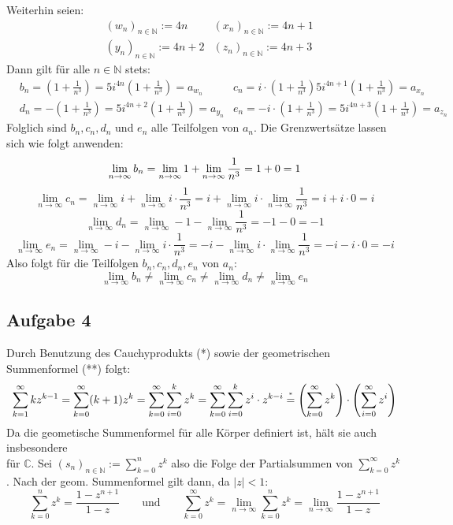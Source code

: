 \documentclass[a4paper,graphics,11pt]{article}
\newcommand{\aufgabe}[1]{\subsection*{Aufgabe #1}}
\newcommand{\up}[2]{\mathrel{\overset{\makebox[0pt]{\mbox{\normalfont\tiny #2}}}{#1}}}
\begin{document}
Weiterhin seien:
\begin{align*}
    &(w_n)_{n\in \mathbb{N}} := 4n&
    (x_n)_{n\in \mathbb{N}} := 4n+1\\
    &(y_n)_{n\in \mathbb{N}} := 4n+2&
    (z_n)_{n\in \mathbb{N}} := 4n+3
\end{align*}
Dann gilt für alle $n\in \mathbb{N}$ stets:
\begin{align*}
    &b_n = \left(1+\frac{1}{n^3}\right)=  5i^{4n}\left(1+\frac{1}{n^3}\right) = a_{w_n}&
    c_n = i\cdot\left(1+\frac{1}{n^3}\right)5i^{4n+1}\left(1+\frac{1}{n^3}\right) = a_{x_n}\\
    &d_n = -\left(1+\frac{1}{n^3}\right) = 5i^{4n+2}\left(1+\frac{1}{n^3}\right) = a_{y_n}&
    e_n = -i\cdot\left(1+\frac{1}{n^3}\right)=5i^{4n+3}\left(1+\frac{1}{n^3}\right) = a_{z_n}
\end{align*}
Folglich sind $b_n,c_n,d_n$ und $e_n$ alle Teilfolgen von $a_n$.
Die Grenzwertsätze lassen sich wie folgt anwenden:
$$
    \lim_{n \to \infty} b_n
    = \lim_{n \to \infty} 1+ \lim_{n \to \infty} \frac{1}{n^3}
    = 1+0 =1\\
$$$$
    \lim_{n \to \infty} c_n
    = \lim_{n \to \infty} i+ \lim_{n \to \infty} i\cdot \frac{1}{n^3}
    = i+\lim_{n \to \infty} i\cdot \lim_{n \to \infty} \frac{1}{n^3}
    = i+i\cdot 0 = i
$$$$
    \lim_{n \to \infty} d_n
    = \lim_{n \to \infty} -1 - \lim_{n \to \infty} \frac{1}{n^3}
    = -1 - 0 = -1
$$$$
   \lim_{n \to \infty} e_n
    = \lim_{n \to \infty} -i- \lim_{n \to \infty} i\cdot \frac{1}{n^3}
    = -i-\lim_{n \to \infty} i\cdot \lim_{n \to \infty} \frac{1}{n^3}
    = -i-i\cdot 0 = -i
$$
Also folgt für die Teilfolgen $b_n,c_n,d_n,e_n$ von $a_n\colon$
$$
    \lim_{n \to \infty} b_n \neq
    \lim_{n \to \infty} c_n \neq
    \lim_{n \to \infty} d_n \neq
    \lim_{n \to \infty} e_n
$$
\newpage
\aufgabe{4}
Durch Benutzung des Cauchyprodukts (*) sowie der geometrischen Summenformel (**) folgt:
$$
    \sum_{k=1}^{\infty} kz^{k-1}
    = \sum_{k=0}^{\infty} (k+1)z^k
    = \sum_{k=0}^{\infty} \sum_{i=0}^{k} z^k
    = \sum_{k=0}^{\infty} \sum_{i=0}^{k} z^i\cdot z^{k-i}
    \up{=}{*} \left(\sum_{k=0}^{\infty} z^k\right) \cdot \left(\sum_{i=0}^{\infty} z^i\right)
$$
Da die geometische Summenformel für alle Körper definiert ist, hält sie auch insbesondere\\
für $\mathbb{C}$. Sei $(s_n)_{n\in \mathbb{N}} := \sum_{k=0}^{n} z^k$ also die Folge
der Partialsummen von $\sum_{k=0}^{\infty} z^k$. Nach der geom. Summenformel gilt dann, da
$|z| < 1\colon$
$$
    \sum_{k=0}^{n} z^k = \frac{1-z^{n+1}}{1-z} 
    \qquad\text{und}\qquad
    \sum_{k=0}^{\infty} z^k = \lim_{n \to \infty} \sum_{k=0}^{n} z^k
    = \lim_{n \to \infty} \frac{1-z^{n+1}}{1-z}
$$
\end{document}
